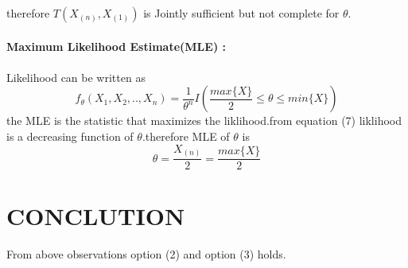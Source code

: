 \documentclass[journal,12pt,twocolumn]{IEEEtran}
\begin{document}
therefore $T(X_{(n)},X_{(1)})$ is Jointly sufficient but not complete for $\theta$. \\ \\
\textbf{Maximum Likelihood Estimate(MLE) :}\\ \\
Likelihood can be written as 
\begin{equation}
    f_\theta(X_1,X_2,..,X_n)=\frac{1}{\theta^n}I\left( \frac{max     \{X\}}{2}\leq\theta\leq min\{X\}\right)
\end{equation}
the MLE is the statistic that maximizes the liklihood.from equation (7) liklihood is a decreasing function of $\theta$.therefore MLE of $\theta$ is 
\begin{equation}
    \theta=\frac{X_{(n)}}{2}=\frac{max\{X\}}{2}
\end{equation}
\section{\textbf{CONCLUTION}}
From above observations option (2) and option (3) holds.
\end{document}
